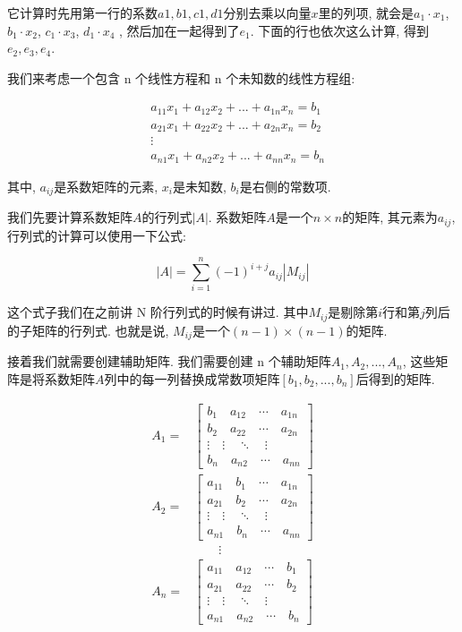 它计算时先用第一行的系数${a1, b1, c1, d1}$分别去乘以向量$x$里的列项, 就会是$a_1 \cdot x_1$, $b_1 \cdot x_2$, $c_1 \cdot x_3$, $d_1 \cdot x_4$ , 然后加在一起得到了$e_1$. 下面的行也依次这么计算, 得到$e_2 ,e_3 ,e_4 $. 

我们来考虑一个包含 n 个线性方程和 n 个未知数的线性方程组: 

\begin{align*}
  & a_{11}x_1 + a_{12}x_2 + ... + a_{1n}x_n = b_1 \\
  & a_{21}x_1 + a_{22}x_2 + ... + a_{2n}x_n = b_2 \\
  & \vdots \\
  & a_{n1}x_1 + a_{n2}x_2 + ... + a_{nn}x_n = b_n
\end{align*}

其中, $a_{ij}$是系数矩阵的元素, $x_i$是未知数, $b_i$是右侧的常数项. 

我们先要计算系数矩阵$A$的行列式$|A|$. 系数矩阵$A$是一个$n \times n$的矩阵, 其元素为$a_{ij}$, 行列式的计算可以使用一下公式:

\[
  |A| = \sum_{i=1}^n(-1)^{i+j}a_{ij}|M_{ij}|
\]

这个式子我们在之前讲 N 阶行列式的时候有讲过. 其中$M_{ij}$是剔除第$i$行和第$j$列后的子矩阵的行列式. 也就是说, $M_{ij}$是一个$(n-1) \times (n-1)$的矩阵. 

接着我们就需要创建辅助矩阵. 我们需要创建 n 个辅助矩阵$A_1,A_2,..., A_n$, 这些矩阵是将系数矩阵$A$列中的每一列替换成常数项矩阵$[b_1,b_2,..., b_n]$后得到的矩阵. 

\begin{align*}
  A_1 =
  & \begin{bmatrix}
  b_1 \quad a_{12} \quad \cdots \quad a_{1n} \\
  b_2 \quad a_{22} \quad \cdots \quad a_{2n} \\
  \vdots \quad \vdots \quad \ddots \quad \vdots \\
  b_n \quad a_{n2} \quad \cdots \quad a_{nn}
  \end{bmatrix} \\
  A_2 =
  & \begin{bmatrix}
  a_{11} \quad b_1 \quad \cdots \quad a_{1n} \\
  a_{21} \quad b_2 \quad \cdots \quad a_{2n} \\
  \vdots \quad \vdots \quad \ddots \quad \vdots \\
  a_{n1} \quad b_n \quad \cdots \quad a_{nn}
  \end{bmatrix} \\
  & \qquad \vdots\\
  A_n =
  & \begin{bmatrix}
  a_{11} \quad a_{12} \quad \cdots \quad b_1 \\
  a_{21} \quad a_{22} \quad \cdots \quad b_2 \\
  \vdots \quad \vdots \quad \ddots \quad \vdots \\
  a_{n1} \quad a_{n2} \quad \cdots \quad b_n
  \end{bmatrix} \\
\end{align*}


